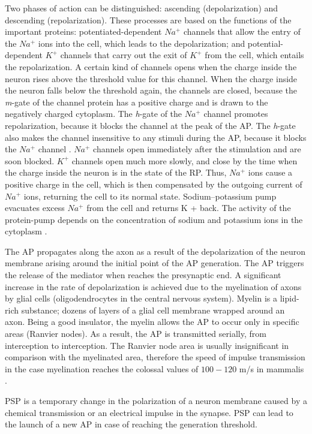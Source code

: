 \documentclass[14pt,a4paper]{scrartcl}
\begin{document}
Two phases of action can be distinguished: ascending (depolarization) and descending (repolarization). These processes are based on the functions of the important proteins: potentiated-dependent $Na^{+}$ channels that allow the entry of the $Na^{+}$ ions into the cell, which leads to the depolarization; and potential-dependent $K^{+}$ channels that carry out the exit of $K^{+}$ from the cell, which entails the repolarization. A certain kind of channels opens when the charge inside the neuron rises above the threshold value for this channel. When the charge inside the neuron falls below the threshold again, the channels are closed, because the \textit{m}-gate of the channel protein has a positive charge and is drawn to the negatively charged cytoplasm. The \textit{h}-gate of the $Na^{+}$ channel promotes repolarization, because it blocks the channel at the peak of the AP. The \textit{h}-gate also makes the channel insensitive to any stimuli during the AP, because it blocks the $Na^{+}$ channel \cite{Marban1998}. $Na^{+}$ channels open immediately after the stimulation and are soon blocked. $K^{+}$ channels open much more slowly, and close by the time when the charge inside the neuron is in the state of the RP. Thus, $Na^{+}$ ions cause a positive charge in the cell, which is then compensated by the outgoing current of $Na^{+}$ ions, returning the cell to its normal state. Sodium–potassium pump evacuates excess $Na^{+}$ from the cell and returns K + back. The activity of the protein-pump depends on the concentration of sodium and potassium ions in the cytoplasm \cite{Purves2004}.

The AP propagates along the axon as a result of the depolarization of the neuron membrane arising around the initial point of the AP generation. The AP triggers the release of the mediator when reaches the presynaptic end. A significant increase in the rate of depolarization is achieved due to the myelination of axons by glial cells (oligodendrocytes in the central nervous system). Myelin is a lipid-rich substance; dozens of layers of a glial cell membrane wrapped around an axon. Being a good insulator, the myelin allows the AP to occur only in specific areas (Ranvier nodes). As a result, the AP is transmitted serially, from interception to interception. The Ranvier node area is usually insignificant in comparison with the myelinated area, therefore the speed of impulse transmission in the case myelination reaches the colossal values of $100-120$ m/s in mammalis \cite{Purves2004}. 

PSP is a temporary change in the polarization of a neuron membrane caused by a chemical transmission or an electrical impulse in the synapse. PSP can lead to the launch of a new AP in case of reaching the generation threshold.
\end{document}
